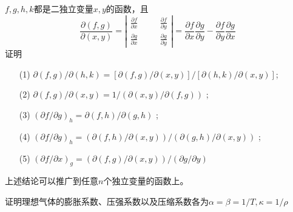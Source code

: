 \begin{question}[p24,3] $f,g,h,k$都是二独立变量$x,y$的函数，且
    \begin{equation}
        \frac{\partial (f,g)}{\partial (x,y)}=
        \left|
        \begin{array}{ccc}
            \frac{\partial f}{\partial x} & \hspace{1em} & \frac{\partial f}{\partial y} \\
            \frac{\partial g}{\partial x} & \hspace{1em} & \frac{\partial g}{\partial y}
        \end{array}
        \right|=\frac{\partial f}{\partial x}\frac{\partial g}{\partial y}-\frac{\partial f}{\partial y}\frac{\partial g}{\partial x}
    \end{equation}
    证明
    \begin{enumerate}[itemindent=2em]
        \item[(1)] $\partial (f,g)/\partial (h,k)=[\partial (f,g)/\partial (x,y)]/[\partial (h,k)/\partial (x,y)]$;
        \item[(2)] $\partial (f,g)/\partial (x,y)=1/(\partial (x,y)/\partial (f,g))$ ;
        \item[(3)] $(\partial f/\partial g)_h=\partial (f,h)/\partial (g,h)$ ;
        \item[(4)] $(\partial f/\partial g)_h=(\partial(f,h)/\partial (x,y))/(\partial (g,h)/\partial (x,y))$ ;
        \item[(5)] $(\partial f/\partial x)_g=(\partial (f,g)/\partial (x,y))/(\partial g/\partial y)$
    \end{enumerate}
\end{question}

\begin{mdframed}[linewidth=0pt, backgroundcolor=gray!15]
    \begin{pf}
        
    \end{pf}
\end{mdframed}

上述结论可以推广到任意$n$个独立变量的函数上。

\begin{question}[p25,6]
    证明理想气体的膨胀系数、压强系数以及压缩系数各为$\alpha=\beta=1/T,\kappa = 1/\rho$
\end{question}

\begin{mdframed}[linewidth=0pt, backgroundcolor=gray!15]
    \begin{pf}
        
    \end{pf}
\end{mdframed}

